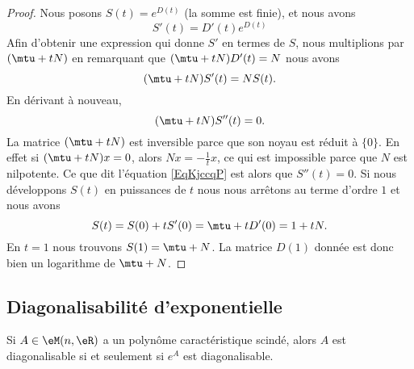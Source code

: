 \begin{proof}
    Nous posons \( S(t)= e^{D(t)}\) (la somme est finie), et nous avons
    \begin{equation}
        S'(t)=D'(t) e^{D(t)}
    \end{equation}
    Afin d'obtenir une expression qui donne \( S'\) en termes de \( S\), nous multiplions par \( (\mtu+tN)\) en remarquant que \( (\mtu+tN)D'(t)=N\) nous avons
    \begin{equation}
        (\mtu+tN)S'(t)=NS(t).
    \end{equation}
    En dérivant à nouveau,
    \begin{equation}    \label{EqKjccqP}
        (\mtu+tN)S''(t)=0.
    \end{equation}
    La matrice \( (\mtu+tN)\) est inversible parce que son noyau est réduit à \( \{ 0 \}\). En effet si \( (\mtu+tN)x=0\), alors \( Nx=-\frac{1}{ t }x\), ce qui est impossible parce que \( N\) est nilpotente. Ce que dit l'équation \eqref{EqKjccqP} est alors que \( S''(t)=0\). Si nous développons \( S(t)\) en puissances de \( t\) nous nous arrêtons au terme d'ordre \( 1\) et nous avons
    \begin{equation}
        S(t)=S(0)+tS'(0)=\mtu+tD'(0)=1+tN.
    \end{equation}
    En \( t=1\) nous trouvons \( S(1)=\mtu+N\). La matrice \( D(1)\) donnée est donc bien un logarithme de $\mtu+N$.
\end{proof}

\subsection{Diagonalisabilité d'exponentielle}

\begin{proposition}      \label{PropCOMNooIErskN}
    Si \( A\in \eM(n,\eR)\) a un polynôme caractéristique scindé, alors \( A\) est diagonalisable si et seulement si \( e^A\) est diagonalisable.
\end{proposition}

